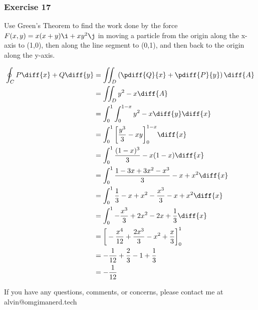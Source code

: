 \documentclass{math}
\begin{document}
\subsubsection*{Exercise 17}
Use Green's Theorem to find the work done by the force
\( F(x,y) = x(x+y)\i+xy^2\j \) in moving a particle from the origin along the
x-axis to (1,0), then along the line segment to (0,1), and then back to the
origin along the y-axis.
\begin{center}
\end{center}
\begin{align*}
  \oint_{C}P\diff{x}+Q\diff{y} &=
    \iint_{D}\left(\pdiff{Q}{x}+\pdiff{P}{y}\right)\diff{A} \\
  &= \iint_{D}y^2-x\diff{A} \\
  &= \int_{0}^{1}\int_{0}^{1-x}y^2-x\diff{y}\diff{x} \\
  &= \int_{0}^{1}\bigg[\frac{y^3}{3}-xy\bigg]_{0}^{1-x}\diff{x} \\
  &= \int_{0}^{1}\frac{(1-x)^3}{3}-x(1-x)\diff{x} \\
  &= \int_{0}^{1}\frac{1-3x+3x^2-x^3}{3}-x+x^2\diff{x} \\
  &= \int_{0}^{1}\frac{1}{3}-x+x^2-\frac{x^3}{3}-x+x^2\diff{x} \\
  &= \int_{0}^{1}-\frac{x^3}{3}+2x^2-2x+\frac{1}{3}\diff{x} \\
  &= \bigg[-\frac{x^4}{12}+\frac{2x^3}{3}-x^2+\frac{x}{3}\bigg]_{0}^{1} \\
  &= -\frac{1}{12}+\frac{2}{3}-1+\frac{1}{3} \\
  &= -\frac{1}{12}
\end{align*}

\begin{center}
  If you have any questions, comments, or concerns, please contact me at
  alvin@omgimanerd.tech
\end{center}
\end{document}
